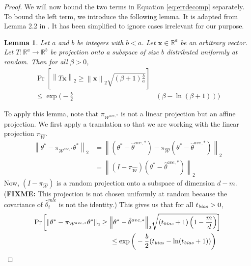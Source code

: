 \documentclass[twoside]{article}
\newtheorem{lemma}{Lemma}
\newcommand{\W}{\mathcal{\hat W}}
\newcommand{\Wtave}{{\mathcal{W}^{ave,*}}}
\newcommand{\x}{\mathbf{x}}
\newcommand{\w}{\theta}
\newcommand{\wtave}{\hat\w^{ave,*}}
\newcommand{\wmle}{\hat\w^{mle}}
\newcommand{\wstar}{{\w^{*}}}
\newcommand{\tbias}{t_{\text{\textit{bias}}}}
\newcommand{\ltwo}[1]{{\left\lVert {#1} \right\rVert}_2}
\newcommand{\proj}[1]{\pi_{{#1}}}
\newcommand{\prob}[1]{\Pr\left[{#1}\right]}
\newcommand{\fixme}[1]{\textbf{FIXME:} {#1}}
\begin{document}
\begin{proof}
We will now bound the two terms in Equation \ref{eq:errdecomp} separately.
To bound the left term, we introduce the following lemma.
It is adapted from Lemma 2.2 in \cite{dasgupta2003elementary}.
It has been simplified to ignore cases irrelevant for our purpose.
\begin{lemma}
Let $a$ and $b$ be integers with $b<a$.
Let $\x\in\mathbb{R}^a$ be an arbitrary vector.
Let $T : \mathbb{R}^a \to \mathbb{R}^b$ be projection onto a subspace of size $b$ distributed uniformly at random.
Then for all $\beta>0$,
\begin{equation}
\begin{split}
\prob{\ltwo{T\x} \ge \ltwo\x\sqrt{(\beta + 1)\frac{b}{a}}}&
\\
\le
\exp \bigg(-\frac{b}{2} & (\beta-\ln(\beta+1))\bigg)
\end{split}
\end{equation}
\end{lemma}
To apply this lemma, note that $\proj\Wtave$ is not a linear projection but an affine projection.
We first apply a translation so that we are working with the linear projection $\proj\W$.
\begin{align}
\ltwo{\wstar-\proj\Wtave\wstar}
&=
\ltwo{(\wstar-\wtave)-\proj\W(\wstar-\wtave)}
\\
&=
\ltwo{(I-\proj\W)(\wstar-\wtave)}
\end{align}
Now, $(I-\proj\W)$ is a random projection onto a subspace of dimension $d-m$.
(\fixme{This projection is not chosen uniformly at random because the covariance of $\wmle_i$ is not the identity.})
This gives us that for all $\tbias>0$,
\begin{equation}
\begin{split}
\prob{\ltwo{\wstar-\proj\Wtave\wstar} \ge \ltwo{\wstar-\wtave}\sqrt{(\tbias + 1)\left(1-\frac{m}{d}\right)}}&
\\
\le
\exp \bigg(-\frac{b}{2} (\tbias-\ln(\tbias+1))\bigg)~~&
\end{split}
\end{equation}

\end{proof}
\end{document}
